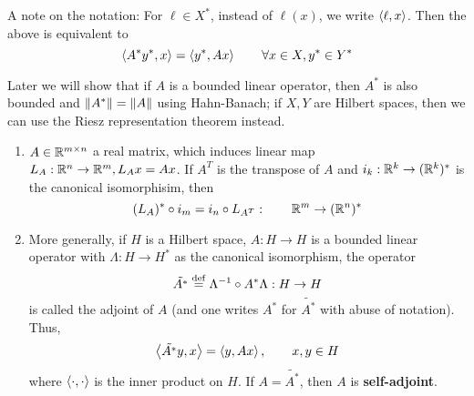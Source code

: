 \documentclass{article}
\begin{document}
A note on the notation: For \(\ell \in X^*\), instead of \(\ell(x)\), we write \(\left<{\ell},{x}\right>\). Then the above is equivalent to
\[\left<{A^* y^*},{x}\right> = \left<{y^*},{A x}\right> \qquad \forall x \in X, y^* \in Y^*\]  

Later we will show that if \(A\) is a bounded linear operator, then \(A^*\) is also bounded and \(\left\|{A^*}\right\|=\left\|{A}\right\|\)
using Hahn-Banach; if \(X, Y\) are Hilbert spaces, then we can use the Riesz representation theorem instead.

\begin{example}
    \begin{enumerate}[1)]
        \item \(A \in \mathbb{R}^{m \times n}\) a real matrix, which induces linear map \(L_A: \mathbb{R}^n \to \mathbb{R}^m, L_Ax=Ax\).
              If \(A^T\) is the transpose of \(A\) and \(i_k: \mathbb{R}^k \to (\mathbb{R}^k)^* \) is the canonical isomorphisim, then
              \[(L_A)^* \circ i_m = i_n \circ L_{A^T}: \qquad \mathbb{R}^m \to (\mathbb{R}^n)^*\]
        \item More generally, if \(H\) is a Hilbert space, \(A: H \to H\) is a bounded linear operator with \(\Lambda: H\to H^*\) as the
                canonical isomorphism, the operator
                \[\tilde{A^*} \overset{\rm{def}}{=} \Lambda^{-1} \circ A^* \Lambda: H \to H\]
            is called the adjoint of \(A\) (and one writes \(A^*\) for \(\tilde{A^*}\) with abuse of notation). Thus,
            \[\left<{\tilde{A^*}y},{x}\right> = \left<{y},{Ax}\right>, \qquad x,y \in H\]
            where \(\left<{\cdot},{\cdot}\right>\) is the inner product on \(H\). If \(A=\tilde{A^*}\), then \(A\) is \textbf{self-adjoint}.
    \end{enumerate}
\end{example}  
\end{document}
